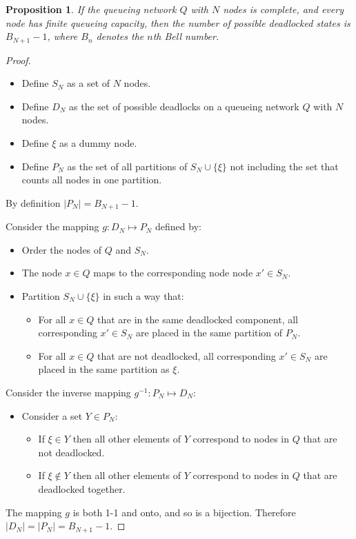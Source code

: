 \documentclass{article}
\newtheorem{proposition}{Proposition}
\begin{document}
\begin{proposition}
  If the queueing network $Q$ with $N$ nodes is complete, and every node has finite queueing capacity, then the number of possible deadlocked states is $B_{N+1} - 1$, where $B_n$ denotes the $n$th Bell number.
\end{proposition}

\begin{proof}

\begin{itemize}

\item Define $S_N$ as a set of $N$ nodes.
\item Define $D_N$ as the set of possible deadlocks on a queueing network $Q$ with $N$ nodes.
\item Define $\xi$ as a dummy node.
\item Define $P_N$ as the set of all partitions of $S_N\cup\{\xi\}$ not including the set that counts all nodes in one partition.

\end{itemize}

By definition $|P_N| = B_{N+1}-1$.

Consider the mapping $g:D_N \mapsto P_N$ defined by:

\begin{itemize}
  \item Order the nodes of $Q$ and $S_N$.
  \item The node $x \in Q$ maps to the corresponding node node $x' \in S_N$.
  \item Partition $S_N\cup\{\xi\}$ in such a way that:
  \begin{itemize}
    \item For all $x \in Q$ that are in the same deadlocked component, all corresponding $x' \in S_N$ are placed in the same partition of $P_N$.
    \item For all $x \in Q$ that are not deadlocked, all corresponding $x' \in S_N$ are placed in the same partition as $\xi$.
  \end{itemize}
\end{itemize}

Consider the inverse mapping $g^{-1}:P_N \mapsto D_N$:

\begin{itemize}
  \item Consider a set $Y \in P_N$:
  \begin{itemize}
    \item If $\xi \in Y$ then all other elements of $Y$ correspond to nodes in $Q$ that are not deadlocked.
    \item If $\xi \notin Y$ then all other elements of $Y$ correspond to nodes in $Q$ that are deadlocked together.
  \end{itemize}
\end{itemize}

The mapping $g$ is both 1-1 and onto, and so is a bijection.
Therefore $|D_N| = |P_N| = B_{N+1}-1$.

\end{proof}
\end{document}
